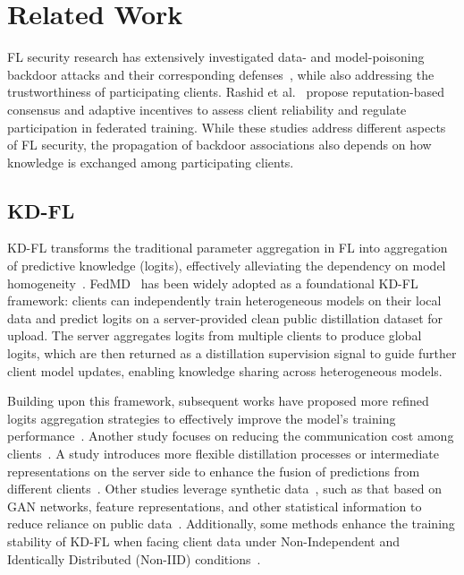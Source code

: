 \documentclass[lettersize,journal]{IEEEtran}
\newif\ifhighlight
\newcommand{\hltwo}[1]{%
    \ifhighlight{\color{reviewer2}#1}\else#1\fi
}
\begin{document}
\section{Related Work}
\hltwo{FL security research has extensively investigated data- and model-poisoning backdoor attacks and their corresponding defenses~\cite{Wan2024Survey}, while also addressing the trustworthiness of participating clients. Rashid et al.~\cite{Rashid2025TFFL} propose reputation-based consensus and adaptive incentives to assess client reliability and regulate participation in federated training. 
While these studies address different aspects of FL security, the propagation of backdoor associations also depends on how knowledge is exchanged among participating clients.}

\subsection{KD-FL}
KD-FL transforms the traditional parameter aggregation in FL into aggregation of predictive knowledge (logits), effectively alleviating the dependency on model homogeneity~\cite{FL_Heterogeneous_survey,different_model}. 
FedMD~\cite{Distillation-FedMD} has been widely adopted as a foundational KD-FL framework: clients can independently train heterogeneous models on their local data and predict logits on a server-provided clean public distillation dataset for upload. 
The server aggregates logits from multiple clients to produce global logits, which are then returned as a distillation supervision signal to guide further client model updates, enabling knowledge sharing across heterogeneous models.

Building upon this framework, subsequent works have proposed more refined logits aggregation strategies to effectively improve the model's training performance~\cite{Distillation_agg2,agg}.
Another study focuses on reducing the communication cost among clients~\cite{communication}.
A study introduces more flexible distillation processes or intermediate representations on the server side to enhance the fusion of predictions from different clients~\cite{Distillation_agg3}.
Other studies leverage synthetic data~\cite{Distillation_agg1}, such as that based on GAN networks, feature representations, and other statistical information to reduce reliance on public data~\cite{Distillation_datafree2,Distillation_datafree3}.
Additionally, some methods enhance the training stability of KD-FL when facing client data under Non-Independent and Identically Distributed (Non-IID) conditions~\cite{Distillation_datafree4,Distillation_datafree_noiid}.
\end{document}
